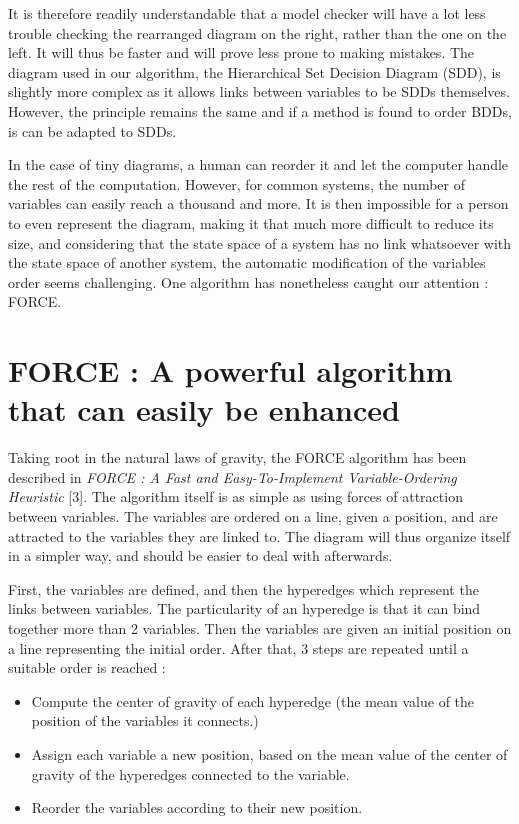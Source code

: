 \documentclass[12pt]{report}
\begin{document}
It is therefore readily understandable that a model checker will have a lot less trouble checking the rearranged diagram on the right, rather than the one on the left. It will thus be faster and will prove less prone to making mistakes. The diagram used in our algorithm, the Hierarchical Set Decision Diagram (SDD), is slightly more complex as it allows links between variables to be SDDs themselves. However, the principle remains the same and if a method is found to order BDDs, is can be adapted to SDDs.

In the case of tiny diagrams, a human can reorder it and let the computer handle the rest of the computation. However, for common systems, the number of variables can easily reach a thousand and more. It is then impossible for a person to even represent the diagram, making it that much more difficult to reduce its size, and considering that the state space of a system has no link whatsoever with the state space of another system, the automatic modification of the variables order seems challenging. One algorithm has nonetheless caught our attention : FORCE.

\chapter{FORCE : A powerful algorithm that can easily be enhanced}

Taking root in the natural laws of gravity, the FORCE algorithm has been described in \textit{FORCE : A Fast and Easy-To-Implement Variable-Ordering Heuristic} [3]. The algorithm itself is as simple as using forces of attraction between variables. The variables are ordered on a line, given a position, and are attracted to the variables they are linked to. The diagram will thus organize itself in a simpler way, and should be easier to deal with afterwards.

First, the variables are defined, and then the hyperedges which represent the links between variables. The particularity of an hyperedge is that it can bind together more than 2 variables. Then the variables are given an initial position on a line representing the initial order. After that, 3 steps are repeated until a suitable order is reached :

\begin{itemize}
  \item Compute the center of gravity of each hyperedge (the mean value of the position of the variables it connects.)
  \item Assign each variable a new position, based on the mean value of the center of gravity of the hyperedges connected to the variable.
  \item Reorder the variables according to their new position.
\end{itemize}
\end{document}
